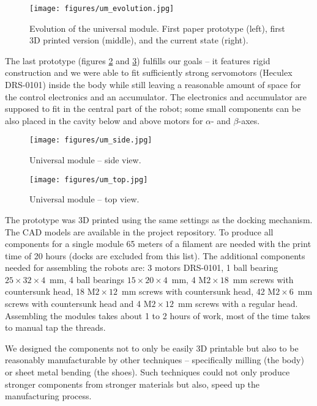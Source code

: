 \begin{figure}[!t]
    \centering
    \texttt{[image: figures/um\_evolution.jpg]}
    \caption{Evolution of the universal module. First paper prototype (left),
    first 3D printed version (middle), and the current state (right).}
    \label{fig:um_evolution}
\end{figure}

The last prototype (figures \ref{fig:um_photo_side} and \ref{fig:um_photo_top})
fulfills our goals -- it features rigid construction and we were able to fit
sufficiently strong servomotors (Heculex DRS-0101) inside the body while still
leaving a reasonable amount of space for the control electronics and an
accumulator. The electronics and accumulator are supposed to fit in the central
part of the robot; some small components can be also placed in the cavity below
and above motors for $\alpha$- and $\beta$-axes.

\begin{figure}[!t]
    \centering
    \texttt{[image: figures/um\_side.jpg]}
    \caption{Universal module -- side view.}
    \label{fig:um_photo_side}
\end{figure}

\begin{figure}[!t]
    \centering
    \texttt{[image: figures/um\_top.jpg]}
    \caption{Universal module -- top view.}
    \label{fig:um_photo_top}
\end{figure}

The prototype was 3D printed using the same settings as the docking mechanism.
The CAD models are available in the project repository. To produce all
components for a single module 65 meters of a filament are needed with the print
time of 20 hours (docks are excluded from this list). The additional components
needed for assembling the robots are: 3 motors DRS-0101, 1 ball bearing
$25\times32\times4$~mm, 4 ball bearings $15\times20\times4$~mm, 4
M$2\times18$~mm screws with countersunk head, 18 M$2\times12$~mm screws with
countersunk head, 42 M$2\times6$~mm screws with countersunk head and 4
M$2\times12$~mm screws with a regular head. Assembling the modules takes about 1
to 2 hours of work, most of the time takes to manual tap the threads.

We designed the components not to only be easily 3D printable but also to be
reasonably manufacturable by other techniques -- specifically milling (the body)
or sheet metal bending (the shoes). Such techniques could not only produce
stronger components from stronger materials but also, speed up the
manufacturing process.
